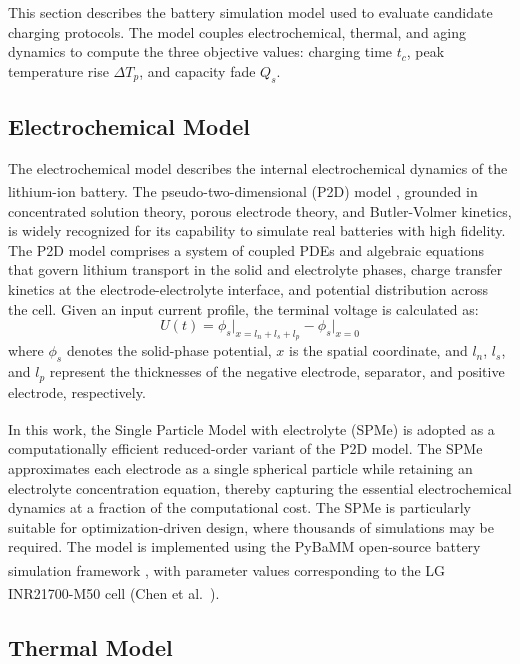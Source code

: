 \documentclass[lettersize,journal]{IEEEtran}
\let\OLDcite\cite
\renewcommand{\cite}[1]{\textsuperscript{\OLDcite{#1}}}
\begin{document}
This section describes the battery simulation model used to evaluate candidate charging protocols. The model couples electrochemical, thermal, and aging dynamics to compute the three objective values: charging time $t_c$, peak temperature rise $\Delta T_p$, and capacity fade $Q_s$.

\subsection{Electrochemical Model}

The electrochemical model describes the internal electrochemical dynamics of the lithium-ion battery. The pseudo-two-dimensional (P2D) model \cite{ref23}, grounded in concentrated solution theory, porous electrode theory, and Butler-Volmer kinetics, is widely recognized for its capability to simulate real batteries with high fidelity. The P2D model comprises a system of coupled PDEs and algebraic equations that govern lithium transport in the solid and electrolyte phases, charge transfer kinetics at the electrode-electrolyte interface, and potential distribution across the cell. Given an input current profile, the terminal voltage is calculated as:
\begin{equation}
\label{eq:voltage}
U(t) = \phi_s\big|_{x=l_n+l_s+l_p} - \phi_s\big|_{x=0}
\end{equation}
where $\phi_s$ denotes the solid-phase potential, $x$ is the spatial coordinate, and $l_n$, $l_s$, and $l_p$ represent the thicknesses of the negative electrode, separator, and positive electrode, respectively.

In this work, the Single Particle Model with electrolyte (SPMe) \cite{ref24} is adopted as a computationally efficient reduced-order variant of the P2D model. The SPMe approximates each electrode as a single spherical particle while retaining an electrolyte concentration equation, thereby capturing the essential electrochemical dynamics at a fraction of the computational cost. The SPMe is particularly suitable for optimization-driven design, where thousands of simulations may be required. The model is implemented using the PyBaMM open-source battery simulation framework \cite{ref_pybamm}, with parameter values corresponding to the LG INR21700-M50 cell (Chen et al.\ \cite{ref_chen2020}).

\subsection{Thermal Model}
\end{document}
